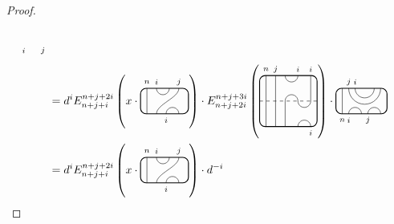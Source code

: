 \documentclass[11pt]{article}
\theoremstyle{plain}
\theoremstyle{definition}
\begin{document}
\begin{proof}
\begin{align*}
\begin{tikzpicture}[baseline=.3cm]
	\node at (.4,-.2) {\scriptsize{$i$}};
	\node at (1,-.2) {\scriptsize{$j$}};
\end{tikzpicture}
\\&=
d^i
E^{n+j+2i}_{n+j+i}\left(
x\cdot
\begin{tikzpicture}[baseline = .3cm]
	\draw[thick, rounded corners = 5pt] (0,0) rectangle (1.5,.8);
	\draw (.2,0) -- (.2,.8);
	\draw (.5,.8) arc (-180:0:.2cm);
	\draw (.5,0) .. controls ++(90:.3cm) and ++(270:.3cm) .. (1.2,.8);
	\draw (.8,0) arc (180:0:.2cm);
	\node at (.2,1) {\scriptsize{$n$}};
	\node at (.5,1) {\scriptsize{$i$}};
	\node at (1.2,1) {\scriptsize{$j$}};
	\node at (.8,-.2) {\scriptsize{$i$}};
\end{tikzpicture}
\right)
\cdot
E^{n+j+3i}_{n+j+2i}\left(
\begin{tikzpicture}[baseline = -.1cm]
	\draw[thick, rounded corners = 5pt] (0,.8) rectangle (1.8,-.8);
	\draw[dashed] (0,0) -- (1.8,0);
	\draw (.2,-.8) -- (.2,.8);
	\draw (1.6,.8) -- (1.6,0) arc (0:-180:.2cm) arc (0:180:.2cm) -- (.8,-.8);
	\draw (.8,.8) arc (-180:0:.2cm);
	\draw (.5,-.8) -- (.5,.8);
	\draw (1.2,-.8) arc (180:0:.2cm);
	\node at (.2,1) {\scriptsize{$n$}};
	\node at (.5,1) {\scriptsize{$j$}};
	\node at (1.2,1) {\scriptsize{$i$}};
	\node at (1.6,1) {\scriptsize{$i$}};
	\node at (1.6,-1) {\scriptsize{$i$}};
\end{tikzpicture}
\right)
\cdot
\begin{tikzpicture}[baseline=.3cm]
	\draw[thick, rounded corners = 5pt] (0,0) rectangle (1.6,.8);
	\draw (.2,0) -- (.2,.8);
	\draw (0.4,.8) arc (-180:0:.5);
	\draw (0.6,.8) arc (-180:0:.3);
	\draw (0.4,0) arc (180:0:.2);
	\draw (1,0) arc (180:0:.2);
	\node at (.2,-.2) {\scriptsize{$n$}};
	\node at (.4,1) {\scriptsize{$j$}};
	\node at (.6,1) {\scriptsize{$i$}};
	\node at (.4,-.2) {\scriptsize{$i$}};
	\node at (1,-.2) {\scriptsize{$j$}};
\end{tikzpicture}
\\&=
d^i
E^{n+j+2i}_{n+j+i}\left(
x\cdot
\begin{tikzpicture}[baseline = .3cm]
	\draw[thick, rounded corners = 5pt] (0,0) rectangle (1.5,.8);
	\draw (.2,0) -- (.2,.8);
	\draw (.5,.8) arc (-180:0:.2cm);
	\draw (.5,0) .. controls ++(90:.3cm) and ++(270:.3cm) .. (1.2,.8);
	\draw (.8,0) arc (180:0:.2cm);
	\node at (.2,1) {\scriptsize{$n$}};
	\node at (.5,1) {\scriptsize{$i$}};
	\node at (1.2,1) {\scriptsize{$j$}};
	\node at (.8,-.2) {\scriptsize{$i$}};
\end{tikzpicture}
\right)
\cdot
d^{-i}\,
\begin{tikzpicture}[baseline = .3cm]

\end{tikzpicture}
\end{align*}
\end{proof}
\end{document}
